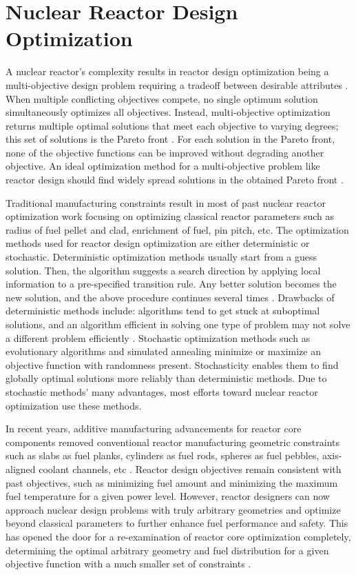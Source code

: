 \section{Nuclear Reactor Design Optimization}
\label{sec:opt}
A nuclear reactor's complexity results in reactor design optimization being a 
multi-objective design problem requiring a tradeoff between desirable 
attributes \cite{byrne_evolving_2014,simon_sciences_2019}. 
When multiple conflicting objectives compete, no single optimum solution 
simultaneously optimizes all objectives. 
Instead, multi-objective optimization returns multiple optimal 
solutions that meet each objective to varying degrees; this set of solutions is 
the Pareto front \cite{deb_multi-objective_2001}. 
For each solution in the Pareto front, none of the objective functions can be 
improved without degrading another objective.
An ideal optimization method for a multi-objective problem like reactor design 
should find widely spread solutions in the obtained Pareto front 
\cite{deb_multi-objective_2001}. 

Traditional manufacturing constraints result in most of past nuclear reactor 
optimization work focusing on optimizing classical reactor 
parameters such as radius of fuel pellet and clad, enrichment of fuel, 
pin pitch, etc. 
The optimization methods used for reactor design optimization are either 
deterministic or stochastic. 
Deterministic optimization methods usually start from a guess solution.
Then, the algorithm suggests a search direction by applying local 
information to a pre-specified transition rule. 
Any better solution becomes the new solution, and the above procedure continues 
several times \cite{deb_multi-objective_2001}. 
Drawbacks of deterministic methods include: algorithms tend to get stuck at
suboptimal solutions, and an algorithm efficient in solving one type of problem 
may not solve a different problem efficiently \cite{deb_multi-objective_2001}. 
Stochastic optimization methods such as evolutionary algorithms and simulated annealing
minimize or maximize an objective function with randomness present. 
Stochasticity enables them to find globally optimal solutions more reliably than 
deterministic methods. 
Due to stochastic methods' many advantages, most efforts toward nuclear 
reactor optimization use these methods. 

In recent years, additive manufacturing advancements for reactor core components 
removed conventional reactor manufacturing geometric constraints such as slabs as fuel 
planks, cylinders as fuel rods, spheres as fuel pebbles, axis-aligned coolant 
channels, etc  \cite{sobes_artificial_2020}.
Reactor design objectives remain consistent with past objectives, such as 
minimizing fuel amount and minimizing the maximum fuel temperature for a given 
power level.
However, reactor designers can now approach nuclear design problems with truly 
arbitrary geometries and optimize beyond classical parameters to further enhance 
fuel performance and safety.
This has opened the door for a re-examination of reactor core 
optimization completely, determining the optimal arbitrary geometry 
and fuel distribution for a given objective function with a much smaller set of 
constraints \cite{sobes_artificial_2020}. 

